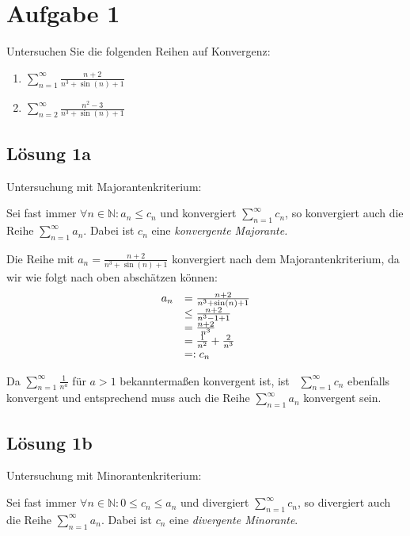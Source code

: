 \documentclass[main.tex]{subfiles}
\begin{document}
\section{Aufgabe 1}

Untersuchen Sie die folgenden Reihen auf Konvergenz:

\begin{enumerate}
    \item $\sum\limits _{n=1}^{\infty }\frac{n+2}{n^{3} +\sin( n) +1}$
    \item $\sum\limits _{n=2}^{\infty }\frac{n^{2} -3}{n^{3} +\sin( n) +1}$
\end{enumerate}

\subsection{Lösung 1a}
Untersuchung mit Majorantenkriterium:

Sei fast immer $\forall n\in \mathbb{N} :a_{n} \leq c_{n}$ und konvergiert $\sum\nolimits _{n=1}^{\infty } c_{n}$, so konvergiert auch die Reihe $\sum\nolimits _{n=1}^{\infty } a_{n}$. Dabei ist $c_{n}$ eine \textit{konvergente Majorante.}

Die Reihe mit $a_{n} =\frac{n+2}{n^{3} +\sin( n) +1}$ konvergiert nach dem Majorantenkriterium, da wir wie folgt nach oben abschätzen können:
\begin{equation*}
\begin{array}{ c l }
a_{n} & =\frac{n+2}{n^{3} +\sin( n) +1}\\
 & \leq \frac{n+2}{n^{3} -1+1}\\
 & =\frac{n+2}{n^{3}}\\
 & =\frac{1}{n^{2}} +\frac{2}{n^{3}}\\
 & =:c_{n}
\end{array}
\end{equation*}

Da $\sum\nolimits _{n=1}^{\infty }\frac{1}{n^{a}}$ für $a >1$ bekanntermaßen konvergent ist, ist \ $\sum _{n=1}^{\infty } c_{n}$ ebenfalls konvergent und entsprechend muss auch die Reihe $\sum\nolimits _{n=1}^{\infty } a_{n}$ konvergent sein.

\subsection{Lösung 1b}
Untersuchung mit Minorantenkriterium:

Sei fast immer $\forall n\in \mathbb{N} :0\leq c_{n} \leq a_{n}$ und divergiert $\sum\nolimits _{n=1}^{\infty } c_{n}$, so divergiert auch die Reihe $\sum\nolimits _{n=1}^{\infty } a_{n}$. Dabei ist $c_{n}$ eine \textit{divergente Minorante}.
\end{document}
